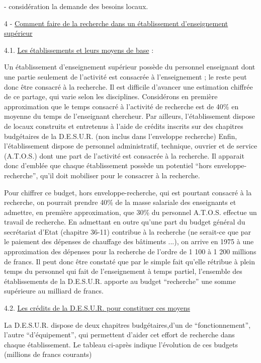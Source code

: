

- considération la demande des besoins locaux.

4 - \uline{Comment faire de la recherche dans un établissement d'enseignement supérieur}

4.1. \uline{Les établissements et leurs moyens de base} :

Un établissement d'enseignement supérieur possède du personnel enseignant dont une partie seulement de l'activité est consacrée à l'enseignement ; le reste peut donc être consacré à la recherche. Il est difficile d'avancer une estimation chiffrée de ce partage, qui varie selon les disciplines. Considérons en première approximation que le temps consacré à l'activité de recherche est de 40\% en moyenne du temps de l'enseignant chercheur. Par ailleurs, l'établissement dispose de locaux construits et entretenus à l'aide de crédits inscrits sur des chapitres budgétaires de la D.E.S.U.R. (non inclus dans l'enveloppe recherche) Enfin, l'établissement dispose de personnel administratif, technique, ouvrier et de service (A.T.O.S.) dont une part de l'activité est consacrée à la recherche. Il apparait donc d'emblée que chaque établissement possède un potentiel ``hors enveloppe-recherche'', qu'il doit mobiliser pour le consacrer à la recherche.

Pour chiffrer ce budget, hors enveloppe-recherche, qui est pourtant consacré à la recherche, on pourrait prendre 40\% de la masse salariale des enseignants et admettre, en première approximation, que 30\% du personnel A.T.O.S. effectue un travail de recherche. En admettant en outre qu'une part du budget général du secrétariat d'Etat (chapitre 36-11) contribue à la recherche (ne serait-ce que par le paiement des dépenses de chauffage des bâtiments ...), on arrive en 1975 à une approximation des dépenses pour la recherche de l'ordre de 1 100 à 1 200 millions de francs. Il peut donc être constaté que par le simple fait qu'elle rétribue à plein temps du personnel qui fait de l'enseignement à temps partiel, l'ensemble des établissements de la D.E.S.U.R. apporte au budget ``recherche'' une somme supérieure au milliard de francs.

4.2. \uline{Les crédits de la D.E.S.U.R. pour constituer ces moyens}

La D.E.S.U.R. dispose de deux chapitres budgétaires,d'un de ``fonctionnement'', l'autre ``d'équipement'', qui permettent d'aider cet effort de recherche dans chaque établissement. Le tableau ci-après indique l'évolution de ces budgets (millions de francs courants)

